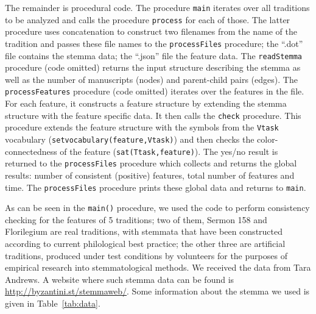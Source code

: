 \documentclass{tlp}
\renewcommand{\|}{\ensuremath{\,|\,}}
\renewcommand{\|}{\,|\,}
\begin{document}
The remainder is procedural code. The procedure \texttt{main} iterates over all traditions to be analyzed and calls
the procedure \texttt{process} for each of those.
%
The latter procedure uses concatenation to construct two filenames
from the name of the tradition and passes these file names to the
\texttt{processFiles} procedure; the ``.dot'' file contains the stemma
data; the ``.json'' file the feature data. The \texttt{readStemma}
procedure (code omitted) returns the input structure describing the
stemma as well as the number of manuscripts (nodes) and parent-child
pairs (edges). The \texttt{processFeatures} procedure (code omitted)
iterates over the features in the file. For each feature, it
constructs a feature structure by extending the stemma structure with
the feature specific data. It then calls the \texttt{check}
procedure. This procedure extends the feature structure with the
symbols from the \texttt{Vtask} vocabulary
(\texttt{setvocabulary(feature,Vtask)}) and then checks the
color-connectedness of the feature (\texttt{sat(Ttask,feature)}).  The
yes/no result is returned to the \texttt{processFiles} procedure which
collects and returns the global results: number of consistent
(positive) features, total number of features and time. The
\texttt{processFiles} procedure prints these global data and returns
to \texttt{main}.

As can be seen in the {\tt main()} procedure, we used the code to
perform consistency checking for the features of 5 traditions; two of
them, Sermon 158 and Florilegium are real traditions, with stemmata
that have been constructed according to current philological best
practice; the other three are artificial traditions, produced under
test conditions by volunteers for the purposes of empirical research
into stemmatological methods.  We received the data from Tara
Andrews. A website where such stemma data can be found is
\url{http://byzantini.st/stemmaweb/}.  Some information about the
stemma we used is given in Table~\ref{tab:data}.

\begin{table}
\caption{The five traditions used in this work.}
\label{tab:data}
\end{table}
\end{document}
